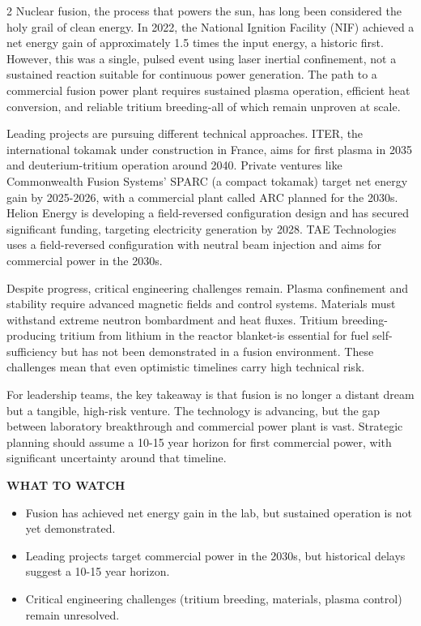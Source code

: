 \documentclass[10pt,a4paper]{article}
\begin{document}
\begin{multicols}{2}
{\small Nuclear fusion, the process that powers the sun, has long been considered the holy grail of clean energy. In 2022, the National Ignition Facility (NIF) achieved a net energy gain of approximately 1.5 times the input energy, a historic first. However, this was a single, pulsed event using laser inertial confinement, not a sustained reaction suitable for continuous power generation. The path to a commercial fusion power plant requires sustained plasma operation, efficient heat conversion, and reliable tritium breeding-all of which remain unproven at scale.}\par
{\small Leading projects are pursuing different technical approaches. ITER, the international tokamak under construction in France, aims for first plasma in 2035 and deuterium-tritium operation around 2040. Private ventures like Commonwealth Fusion Systems' SPARC (a compact tokamak) target net energy gain by 2025-2026, with a commercial plant called ARC planned for the 2030s. Helion Energy is developing a field-reversed configuration design and has secured significant funding, targeting electricity generation by 2028. TAE Technologies uses a field-reversed configuration with neutral beam injection and aims for commercial power in the 2030s.}\par
{\small Despite progress, critical engineering challenges remain. Plasma confinement and stability require advanced magnetic fields and control systems. Materials must withstand extreme neutron bombardment and heat fluxes. Tritium breeding-producing tritium from lithium in the reactor blanket-is essential for fuel self-sufficiency but has not been demonstrated in a fusion environment. These challenges mean that even optimistic timelines carry high technical risk.}\par
{\small For leadership teams, the key takeaway is that fusion is no longer a distant dream but a tangible, high-risk venture. The technology is advancing, but the gap between laboratory breakthrough and commercial power plant is vast. Strategic planning should assume a 10-15 year horizon for first commercial power, with significant uncertainty around that timeline.}\par
\end{multicols}
\vspace{4pt}\noindent\begin{minipage}{\linewidth}
{\textcolor{BOGreen}{\scriptsize\bfseries WHAT TO WATCH}}\par\vspace{2pt}
{\footnotesize\begin{itemize}
\item Fusion has achieved net energy gain in the lab, but sustained operation is not yet demonstrated.
\item Leading projects target commercial power in the 2030s, but historical delays suggest a 10-15 year horizon.
\item Critical engineering challenges (tritium breeding, materials, plasma control) remain unresolved.
\end{itemize}}
\end{minipage}
\label{chap:1:end}
\end{document}
